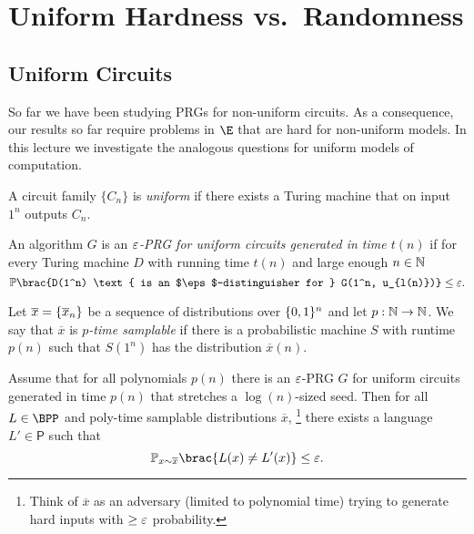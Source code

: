 \newcommand{\fws}{\ensuremath{ f^{\text{ws}} }}

\chapter{Uniform Hardness vs.\ Randomness}
\label{lec:04}


\section{Uniform Circuits}

So far we have been studying PRGs for non-uniform circuits. As a consequence,
our results so far require problems in $\E$ that are hard for non-uniform models.
In this lecture we investigate the analogous questions for uniform models of
computation.


\begin{definition}
  A circuit family $\{C_n\}$ is \emph{uniform} if there exists a Turing machine that on input $1^n$ outputs $C_n$.
\end{definition}

\begin{definition}
  An algorithm $G$ is an \emph{$\varepsilon$-PRG for uniform circuits generated in
  time $t(n)$} if for every Turing machine $D$ with running time $t(n)$ and
  large enough $n \in \mathbb{N}$
	\[
		\Pr\brac{D(1^n) \text{ is an $\eps$-distinguisher for } G(1^n, u_{l(n)})} \leq \eps.
	\]
\end{definition}

\begin{definition}\label{p-sample-dist}
  Let $\overline{x} = \{\overline{x}_n\}$ be a sequence of distributions over
  $\{0, 1\}^n$ and let $p : \mathbb{N} \to \mathbb{N}$. We say that $\overline{x}$ is
  \emph{$p$-time samplable} if there is a probabilistic machine $S$ with
  runtime $p(n)$ such that $S(1^n)$ has the distribution $\overline{x}(n)$.
\end{definition}

\begin{theorem}\label{thm:DR-on-average}
  Assume that for all polynomials $p(n)$ there is an $\varepsilon$-PRG $G$ for uniform
  circuits generated in time $p(n)$ that stretches a $\log(n)$-sized seed. Then
  for all $L \in \BPP$ and poly-time samplable distributions $\overline{x}$,%
  \footnote{Think of $\overline{x}$ as an adversary (limited to polynomial
  time) trying to generate hard inputs with $\geq \varepsilon$ probability.} there
  exists a language $L' \in \textsf{P}$ such that
	\[
		\Pr_{x \sim \overline{x}}\brac{L(x) \neq L'(x)} \leq \eps.
	\]
\end{theorem}

